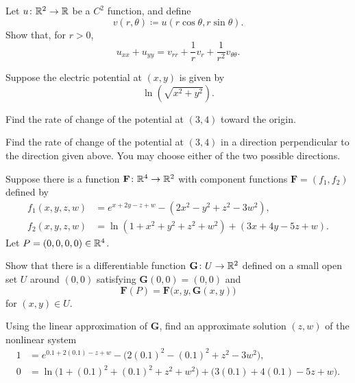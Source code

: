 \begin{problem}
Let $u\colon\mathbb{R}^2\to\mathbb{R}$ be a $C^2$ function, and define
\[
v(r, \theta)\coloneqq u(r\cos\theta, r\sin\theta).
\]
Show that, for $r>0$,
\[
u_{xx}+u_{yy}
=
v_{rr}+\frac1r v_r+\frac1{r^2}v_{\theta\theta}.
\]
\end{problem}

\begin{problem}
Suppose the electric potential at $(x, y)$ is given by
\[
\ln\!\left(\sqrt{x^2+y^2}\right).
\]
\begin{problemsubparts}
\item Find the rate of change of the potential at $(3, 4)$ toward the origin.
\item Find the rate of change of the potential at $(3, 4)$ in a direction perpendicular to the direction given above. You may choose either of the two possible directions.
\end{problemsubparts}
\end{problem}

\begin{problem}
Suppose there is a function $\mathbf F\colon\mathbb{R}^4\to\mathbb{R}^2$ with component functions $\mathbf F=(f_1, f_2)$ defined by
\[
\begin{aligned}
f_1(x, y, z, w)
&=e^{x+2y-z+w}-(2x^2-y^2+z^2-3w^2), \\
f_2(x, y, z, w)
&=\ln(1+x^2+y^2+z^2+w^2)+(3x+4y-5z+w).
\end{aligned}
\]
Let $P=(0, 0, 0, 0)\in\mathbb{R}^4$.
\begin{problemsubparts}
\item Show that there is a differentiable function $\mathbf G\colon U\to\mathbb{R}^2$ defined on a small open set $U$ around $(0, 0)$ satisfying $\mathbf G(0, 0)=(0, 0)$ and
\[
\mathbf F(P)=\mathbf F\bigl(x, y, \mathbf G(x, y)\bigr)
\]
for $(x, y)\in U$.
\item Using the linear approximation of $\mathbf G$, find an approximate solution $(z, w)$ of the nonlinear system
\[
\begin{aligned}
1&=e^{0.1+2(0.1)-z+w}-\bigl(2(0.1)^2-(0.1)^2+z^2-3w^2\bigr), \\
0&=\ln\bigl(1+(0.1)^2+(0.1)^2+z^2+w^2\bigr)
   +\bigl(3(0.1)+4(0.1)-5z+w\bigr).
\end{aligned}
\]
\end{problemsubparts}
\end{problem}

